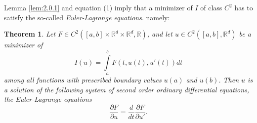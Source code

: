 \documentclass{article}
\newtheorem{theorem}{Theorem}[section]
\theoremstyle{definition}
\theoremstyle{remark}
\theoremstyle{definition}
\begin{document}
        \vspace{4mm} Lemma \ref{lem:2.0.1} and equation (1) imply that a minimizer of $I$ of class $C^2$ has to satisfy the so-called \textit{Euler-Lagrange equations}. namely:\newpage
            \begin{theorem}\label{thm:2.0.1}
                Let $F\in C^2([a,b]\times\mathbb{R}^d\times\mathbb{R}^d,\mathbb{R})$, and let $u\in C^2([a,b],\mathbb{R}^d)$ be a minimizer of 
                    \begin{equation*}
                        I(u)=\int\limits_a^b F(t,u(t),u'(t))dt
                    \end{equation*}
                \noindent among all functions with prescribed boundary values $u(a)$ and $u(b)$. Then $u$ is a solution of the following system of second order ordinary differential equations, the Euler-Lagrange equations
                    \begin{equation*}
                        \frac{\partial F}{\partial u}=\frac{d}{dt}\frac{\partial F}{\partial u'}.
                    \end{equation*}
            \end{theorem}
\end{document}
